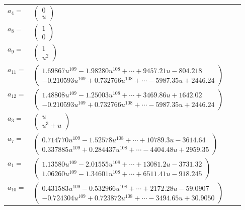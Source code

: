 \documentclass[1p]{elsarticle_modified}
\theoremstyle{definition}
\begin{document}
\begin{tabular}{m{7pt} m{180pt} m{7pt} m{180pt} }
\flushright $a_{4}=$&$\begin{pmatrix}0\\u\end{pmatrix}$ \\
\flushright $a_{8}=$&$\begin{pmatrix}1\\0\end{pmatrix}$ \\
\flushright $a_{9}=$&$\begin{pmatrix}1\\u^2\end{pmatrix}$ \\
\flushright $a_{11}=$&$\begin{pmatrix}1.69867 u^{109}-1.98280 u^{108}+\cdots+9457.21 u-804.218\\-0.210593 u^{109}+0.732766 u^{108}+\cdots-5987.35 u+2446.24\end{pmatrix}$ \\
\flushright $a_{12}=$&$\begin{pmatrix}1.48808 u^{109}-1.25003 u^{108}+\cdots+3469.86 u+1642.02\\-0.210593 u^{109}+0.732766 u^{108}+\cdots-5987.35 u+2446.24\end{pmatrix}$ \\
\flushright $a_{3}=$&$\begin{pmatrix}u\\u^3+u\end{pmatrix}$ \\
\flushright $a_{7}=$&$\begin{pmatrix}0.714770 u^{109}-1.52578 u^{108}+\cdots+10789.3 u-3614.64\\0.337885 u^{109}+0.284437 u^{108}+\cdots-4404.48 u+2959.35\end{pmatrix}$ \\
\flushright $a_{1}=$&$\begin{pmatrix}1.13580 u^{109}-2.01555 u^{108}+\cdots+13081.2 u-3731.32\\1.06260 u^{109}-1.34601 u^{108}+\cdots+6511.41 u-918.245\end{pmatrix}$ \\
\flushright $a_{10}=$&$\begin{pmatrix}0.431583 u^{109}-0.532966 u^{108}+\cdots+2172.28 u-59.0907\\-0.724304 u^{109}+0.723872 u^{108}+\cdots-3494.65 u+30.9050\end{pmatrix}$ \\

\end{tabular}
\end{document}
